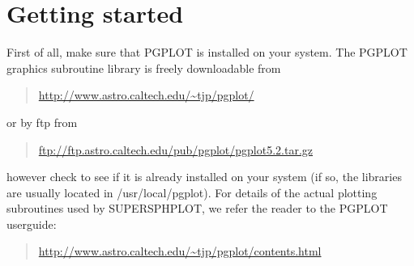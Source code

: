 \documentclass[a4paper,12pt]{article}
\begin{document}
\section{Getting started}
 First of all, make sure that PGPLOT is installed on your system. The PGPLOT
graphics subroutine library is freely downloadable from
\begin{quote}
\url{http://www.astro.caltech.edu/~tjp/pgplot/}
\end{quote}
or by ftp from
\begin{quote}
\url{ftp://ftp.astro.caltech.edu/pub/pgplot/pgplot5.2.tar.gz}
\end{quote}
however check to see if it is already installed on your system (if so, the libraries are
usually located in /usr/local/pgplot). For details of the actual plotting subroutines
used by SUPERSPHPLOT, we refer the reader to the PGPLOT userguide:
\begin{quote}
\url{http://www.astro.caltech.edu/~tjp/pgplot/contents.html}
\end{quote}
\end{document}

